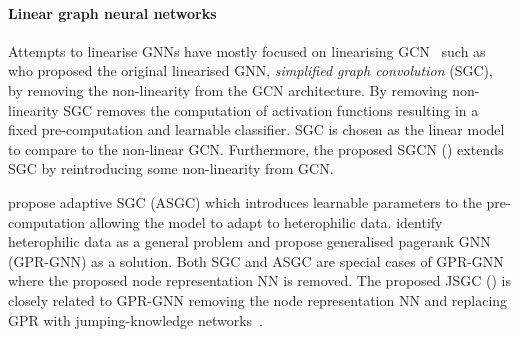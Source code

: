 \paragraph{Linear graph neural networks}
Attempts to linearise GNNs have mostly focused on linearising GCN~\cite{kipf2016semi} such as \citet{wu2019simplifying} who proposed the original linearised GNN, \emph{simplified graph convolution} (SGC), by removing the non-linearity from the GCN architecture.
By removing non-linearity SGC removes the computation of activation functions resulting in a fixed pre-computation and learnable classifier.
SGC is chosen as the linear model to compare to the non-linear GCN.
Furthermore, the proposed SGCN () extends SGC by reintroducing some non-linearity from GCN.

\citet{chanpuriya2022simplified} propose adaptive SGC (ASGC) which introduces learnable parameters to the pre-computation allowing the model to adapt to heterophilic data.
\citet{chien2020adaptive} identify heterophilic data as a general problem and propose generalised pagerank GNN (GPR-GNN) as a solution.
Both SGC and ASGC are special cases of GPR-GNN where the proposed node representation NN is removed.
The proposed JSGC () is closely related to GPR-GNN removing the node representation NN and replacing GPR with jumping-knowledge networks~\cite{xu2018representation}.
